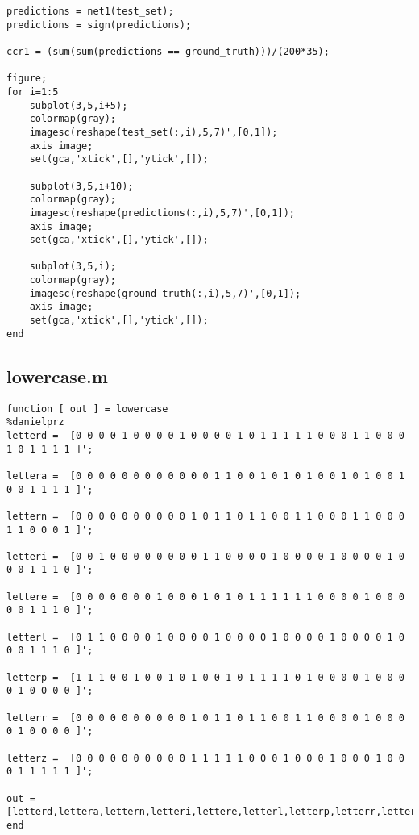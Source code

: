 \begin{lstlisting}[frame=single]
% Performance on test set
predictions = net1(test_set);
predictions = sign(predictions);

ccr1 = (sum(sum(predictions == ground_truth)))/(200*35);

figure;
for i=1:5
    subplot(3,5,i+5);
    colormap(gray);
    imagesc(reshape(test_set(:,i),5,7)',[0,1]);
    axis image;
    set(gca,'xtick',[],'ytick',[]);

    subplot(3,5,i+10);
    colormap(gray);
    imagesc(reshape(predictions(:,i),5,7)',[0,1]);
    axis image;
    set(gca,'xtick',[],'ytick',[]);

    subplot(3,5,i);
    colormap(gray);
    imagesc(reshape(ground_truth(:,i),5,7)',[0,1]);
    axis image;
    set(gca,'xtick',[],'ytick',[]);
end
\end{lstlisting}


\subsection{lowercase.m}
\begin{lstlisting}[frame=single]
function [ out ] = lowercase
%danielprz
letterd =  [0 0 0 0 1 0 0 0 0 1 0 0 0 0 1 0 1 1 1 1 1 0 0 0 1 1 0 0 0 1 0 1 1 1 1 ]';

lettera =  [0 0 0 0 0 0 0 0 0 0 0 0 1 1 0 0 1 0 1 0 1 0 0 1 0 1 0 0 1 0 0 1 1 1 1 ]';

lettern =  [0 0 0 0 0 0 0 0 0 0 1 0 1 1 0 1 1 0 0 1 1 0 0 0 1 1 0 0 0 1 1 0 0 0 1 ]';

letteri =  [0 0 1 0 0 0 0 0 0 0 0 1 1 0 0 0 0 1 0 0 0 0 1 0 0 0 0 1 0 0 0 1 1 1 0 ]';

lettere =  [0 0 0 0 0 0 0 1 0 0 0 1 0 1 0 1 1 1 1 1 1 0 0 0 0 1 0 0 0 0 0 1 1 1 0 ]'; 
        
letterl =  [0 1 1 0 0 0 0 1 0 0 0 0 1 0 0 0 0 1 0 0 0 0 1 0 0 0 0 1 0 0 0 1 1 1 0 ]';

letterp =  [1 1 1 0 0 1 0 0 1 0 1 0 0 1 0 1 1 1 1 0 1 0 0 0 0 1 0 0 0 0 1 0 0 0 0 ]';    
        
letterr =  [0 0 0 0 0 0 0 0 0 0 1 0 1 1 0 1 1 0 0 1 1 0 0 0 0 1 0 0 0 0 1 0 0 0 0 ]';
        
letterz =  [0 0 0 0 0 0 0 0 0 0 1 1 1 1 1 0 0 0 1 0 0 0 1 0 0 0 1 0 0 0 1 1 1 1 1 ]';
        
out = [letterd,lettera,lettern,letteri,lettere,letterl,letterp,letterr,letterz];
end
\end{lstlisting}
